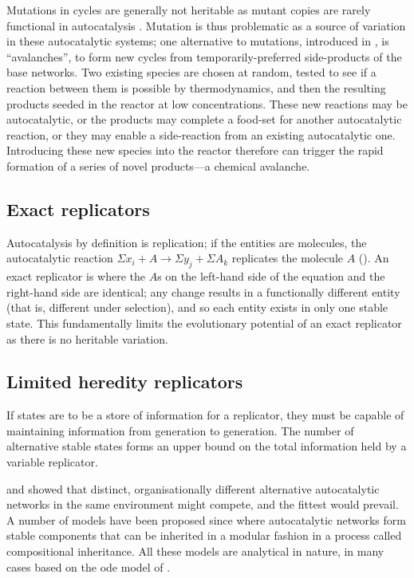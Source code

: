 Mutations in cycles are generally not heritable as mutant copies are rarely functional in autocatalysis \parencite{Vasas2012a}. Mutation is thus problematic as a source of variation in these autocatalytic systems; one alternative to mutations, introduced in \textcite{Fernando:2007pf},  is ``avalanches'', to form new cycles from temporarily-preferred side-products of the base networks. Two existing species are chosen at random, tested to see if a reaction between them is possible by thermodynamics, and then the resulting products seeded in the reactor at low concentrations. These new reactions may be autocatalytic, or the products may complete a food-set for another autocatalytic reaction, or they may enable a side-reaction from an existing autocatalytic one. Introducing these new species into the reactor therefore can trigger the rapid formation of a series of novel products---a chemical avalanche.

\subsection{Exact replicators}\label{non-informational-exact-replicators}

Autocatalysis by definition is replication; if the entities are molecules, the autocatalytic reaction $\Sigma x_i + A\rightarrow \Sigma y_j + \Sigma A_k$ replicates the molecule $A$ (\eg \textcite{Lifson1997}). An exact replicator is where the $A$s on the left-hand side of the equation and the right-hand side are identical; any change results in a functionally different entity (that is, different under selection), and so each entity exists in only one stable state. This fundamentally limits the evolutionary potential of an exact replicator as there is no heritable variation.

\subsection{Limited heredity replicators}\label{variable-replicators}

If states are to be a store of information for a replicator, they must be capable of maintaining information from generation to generation. The number of alternative stable states forms an upper bound on the total information held by a variable replicator.

\Textcite{Ganti:2003hl} and  \textcite{Eigen1971} showed that distinct, organisationally different alternative autocatalytic networks in the same environment might compete, and the fittest would prevail. A number of models have been proposed since where autocatalytic networks form stable components that can be inherited in a modular fashion in a process called compositional inheritance. All these models are analytical in nature, in many cases based on the \gls{ode} model of \cite{Farmer1986}.


